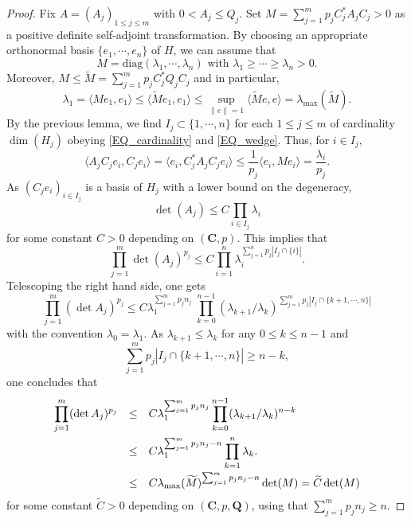 \documentclass[11pt,a4paper,reqno]{amsart}
\numberwithin{equation}{section}
\theoremstyle{definition}
\newcommand{\nm}{\noalign{\smallskip}}
\newcommand{\ds}{\displaystyle}
\renewcommand{\tilde}{\widetilde}
\newcommand{\<}{\ensuremath \leq}
\renewcommand{\>}{\ensuremath \geq}
\renewcommand{\tilde}{\widetilde}
\begin{document}
\begin{proof}
    Fix $A=(A_j)_{1 \leq j \leq m}$ with $0<A_j \leq Q_j.$ Set $M=\sum_{j=1}^m p_jC_j^*A_jC_j>0$ as a positive definite self-adjoint transformation. By choosing an appropriate orthonormal basis $\{e_1,\cdots,e_n\}$ of $H$, we can assume that $$M=\mathrm{diag}(\lambda_1,\cdots,\lambda_n) \text{ with } \lambda_1 \geq \cdots \geq \lambda_n>0.$$ Moreover, $M \leq \tilde M=\sum_{j=1}^m p_jC_j^*Q_jC_j$ and in particular, $$\lambda_1=\langle Me_1,e_1\rangle \leq \langle \tilde Me_1,e_1\rangle \leq \sup_{\|e\|=1}\langle \tilde Me,e\rangle=\lambda_{\max}(\tilde M).$$ By the previous lemma, we find $I_j \subset \{1,\cdots,n\}$ for each $1 \leq j \leq m$ of cardinality $\dim(H_j)$ obeying \cref{EQ_cardinality} and \cref{EQ_wedge}. Thus, for $i \in I_j$, $$\langle A_jC_je_i,C_je_i \rangle=\langle e_i, C_j^*A_jC_je_i \rangle \leq \frac{1}{p_j}\langle e_i,Me_i \rangle=\frac{\lambda_i}{p_j}.$$ As $(C_je_i)_{i \in I_j}$ is a basis of $H_j$ with a lower bound on the degeneracy, $$\det(A_j) \leq C\prod_{i \in I_j}\lambda_i$$ for some constant $C>0$ depending on $(\textbf{C},p).$ This implies that $$\prod_{j=1}^m \det(A_j)^{p_j} \leq C\prod_{i=1}^n \lambda_i^{\sum_{j=1}^n p_j|I_j \cap \{i\}|}.$$ Telescoping the right hand side, one gets $$\prod_{j=1}^m (\det A_j)^{p_j} \leq C\lambda_1^{\sum_{j=1}^m p_jn_j} \; \prod_{k=0}^{n-1}(\lambda_{k+1}/\lambda_k)^{\sum_{j=1}^m p_j|I_j \cap \{k+1,\cdots,n\}|}$$ with the convention $\lambda_0=\lambda_1.$ As $\lambda_{k+1} \leq \lambda_k$ for any $0 \leq k \leq n-1$ and $$\sum_{j=1}^m p_j|I_j \cap \{k+1,\cdots,n\}| \geq n-k,$$ one concludes that $$\begin{array}{lll}
    \ds \prod_{j=1}^m (\det A_j)^{p_j} &\leq& \ds C\lambda_1^{\sum_{j=1}^m p_jn_j}\prod_{k=0}^{n-1}(\lambda_{k+1}/\lambda_k)^{n-k} \\
    \nm 
    &\leq& \ds C\lambda_1^{\sum_{j=1}^m p_jn_j-n}\prod_{k=1}^{n}\lambda_k. \\
    \nm 
    &\leq& \ds C\lambda_{\max}(\tilde M)^{\sum_{j=1}^m p_jn_j-n}\det(M)=\tilde{C}\det(M)
    \end{array}$$ for some constant $\tilde C>0$ depending on $(\textbf{C},p,\textbf{Q})$, using that $\sum_{j=1}^m p_jn_j \geq n.$ 




\end{proof}
\end{document}
